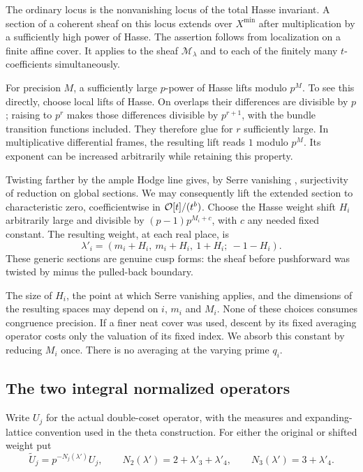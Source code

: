 The ordinary locus is the nonvanishing locus of the total Hasse
invariant.  A section of a coherent sheaf on this locus extends
over $X^{\min}$ after multiplication by a sufficiently high power
of Hasse.  The assertion follows from localization on a finite
affine cover.  It applies to the sheaf $\mathcal M_\lambda$ and to
each of the finitely many $t$-coefficients simultaneously.

For precision $M$, a sufficiently large $p$-power of Hasse lifts
modulo $p^M$.  To see this directly, choose local lifts of Hasse.
On overlaps their differences are divisible by $p$; raising to
$p^r$ makes those differences divisible by $p^{r+1}$, with the
bundle transition functions included.  They therefore glue for
$r$ sufficiently large.  In multiplicative differential frames,
the resulting lift reads $1$ modulo $p^M$.  Its exponent can be
increased arbitrarily while retaining this property.

Twisting farther by the ample Hodge line gives, by Serre vanishing
\citep[Chapter~III, Theorem~5.2 and Proposition~5.3]{Hartshorne1977}, surjectivity of
reduction on global sections.  We may consequently lift the
extended section to characteristic zero, coefficientwise in
$\mathcal O[t]/(t^b)$.  Choose the Hasse weight shift $H_i$ arbitrarily
large and divisible by $(p-1)p^{M_i+c}$, with $c$ any needed fixed
constant.  The resulting weight, at each real place, is
\begin{equation}
 \lambda'_i
   =(m_i+H_i,\ m_i+H_i,\ 1+H_i;\ -1-H_i).
 \label{eq:shifted-weight}
\end{equation}
These generic sections are genuine cusp forms: the sheaf before
pushforward was twisted by minus the pulled-back boundary.

The size of $H_i$, the point at which Serre vanishing applies, and
the dimensions of the resulting spaces may depend on $i$, $m_i$
and $M_i$.  None of these choices consumes congruence precision.
If a finer neat cover was used, descent by its fixed averaging
operator costs only the valuation of its fixed index.  We absorb
this constant by reducing $M_i$ once.  There is no averaging at
the varying prime $q_i$.

\subsection{The two integral normalized operators}

Write $U_j$ for the actual double-coset operator, with the measures
and expanding-lattice convention used in the theta construction.
For either the original or shifted weight put
\begin{equation}
 \widetilde U_j=p^{-N_j(\lambda')}U_j,
 \qquad
 N_2(\lambda')=2+\lambda'_3+\lambda'_4,
 \qquad
 N_3(\lambda')=3+\lambda'_4.
 \label{eq:ordinary-normalization}
\end{equation}

